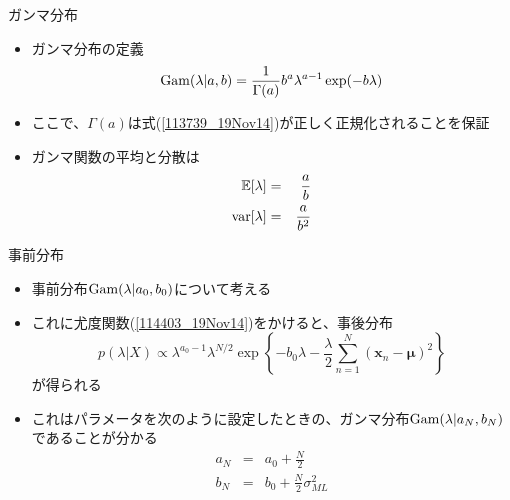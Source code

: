 \begin{frame}{ガンマ分布}
 \begin{itemize}
  \item ガンマ分布の定義
        \begin{equation}
         {\rm Gam}(\lambda|a,b) = \frac{1}{\Gamma(a)}b^a\lambda^{a-1}\exp(-b\lambda)\label{113739_19Nov14}
        \end{equation}
  \item ここで、$\Gamma(a)$は式(\ref{113739_19Nov14})が正しく正規化されることを保証
  \item ガンマ関数の平均と分散は
        \begin{eqnarray}
         \mathbb{E}[\lambda] &=& \frac{a}{b}\\
         {\rm var}[\lambda]& =& \frac{a}{b^2}
        \end{eqnarray}
 \end{itemize}
\end{frame}

\begin{frame}{事前分布}
 \begin{itemize}
  \item 事前分布${\rm Gam}(\lambda|a_0,b_0)$について考える
  \item これに尤度関数(\ref{114403_19Nov14})をかけると、事後分布
        \begin{equation}
         p(\lambda|X) \propto \lambda^{a_0-1}\lambda^{N/2}\exp\left\{-b_0\lambda-\frac{\lambda}{2}\sum_{n=1}^{N}(\bm{x}_n-\bm{\mu})^2\right\}\label{114734_19Nov14}
        \end{equation}
        が得られる
  \item これはパラメータを次のように設定したときの、ガンマ分布${\rm Gam}(\lambda|a_N,b_N)$であることが分かる
        \begin{eqnarray}
         a_N&=& a_0 + \frac{N}{2}\label{115004_19Nov14}\\
         b_N%
         &= & b_0+\frac{N}{2}\sigma^2_{ML}\label{115046_19Nov14}
        \end{eqnarray}
 \end{itemize}
\end{frame}

